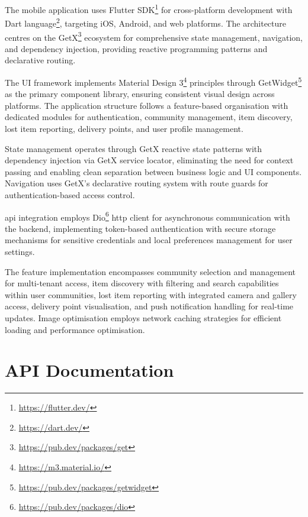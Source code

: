 The mobile application uses Flutter SDK\footnote{\url{https://flutter.dev/}} for cross-platform development with Dart language\footnote{\url{https://dart.dev/}}, targeting iOS, Android, and web platforms. The architecture centres on the GetX\footnote{\url{https://pub.dev/packages/get}} ecosystem for comprehensive state management, navigation, and dependency injection, providing reactive programming patterns and declarative routing.

The UI framework implements Material Design 3\footnote{\url{https://m3.material.io/}} principles through GetWidget\footnote{\url{https://pub.dev/packages/getwidget}} as the primary component library, ensuring consistent visual design across platforms. The application structure follows a feature-based organisation with dedicated modules for authentication, community management, item discovery, lost item reporting, delivery points, and user profile management.

State management operates through GetX reactive state patterns with dependency injection via GetX service locator, eliminating the need for context passing and enabling clean separation between business logic and UI components. Navigation uses GetX's declarative routing system with route guards for authentication-based access control.

\ac{api} integration employs Dio\footnote{\url{https://pub.dev/packages/dio}} \ac{http} client for asynchronous communication with the backend, implementing token-based authentication with secure storage mechanisms for sensitive credentials and local preferences management for user settings.

The feature implementation encompasses community selection and management for multi-tenant access, item discovery with filtering and search capabilities within user communities, lost item reporting with integrated camera and gallery access, delivery point visualisation, and push notification handling for real-time updates. Image optimisation employs network caching strategies for efficient loading and performance optimisation.




\section{API Documentation} \label{section:api_documentation}

